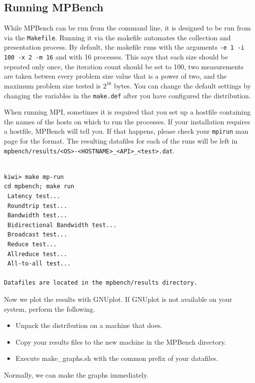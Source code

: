 \documentclass [12pt]{article}
\begin{document}
\subsection{Running MPBench}

While MPBench can be run from the command line, it is designed to be run
from via the {\tt Makefile}.  Running it via the makefile automates the collection and
presentation process. By default, the makefile runs
with the arguments {\tt  -e 1 -i 100 -x 2 -m 16} and with 16 processes. This says that each 
size should be repeated only once, the iteration count should be
set to 100, two measurements are taken betwen every problem size value that is a power of two, 
and the maximum problem size tested is $2 ^{16}$ bytes. You can change the default settings 
by changing the variables in the {\tt make.def} after you have configured the distribution.

When running MPI, sometimes it is required that
you set up a hostfile containing the names of the hosts on which to run the 
processes. If your installation requires a hostfile, MPBench will tell you. 
If that happens, please check your {\tt mpirun} man page for the format.
The resulting datafiles for each of the runs will be left in \\
{\tt mpbench/results/<OS>-<HOSTNAME>\_<API>\_<test>.dat}.



\begin{verbatim}

kiwi> make mp-run
cd mpbench; make run
 Latency test...
 Roundtrip test...
 Bandwidth test...
 Bidirectional Bandwidth test...
 Broadcast test...
 Reduce test...
 Allreduce test...
 All-to-all test...

Datafiles are located in the mpbench/results directory.

\end{verbatim}

Now we plot the results with GNUplot. If GNUplot is not available on
your system, perform the following.

\begin{itemize}
\item Unpack the distribution on a machine that does.
\item Copy your results files to the new machine in the MPBench directory.
\item Execute make\_graphs.sh with the common prefix of your datafiles.
\end{itemize}

Normally, we can make the graphs immediately.
\end{document}
